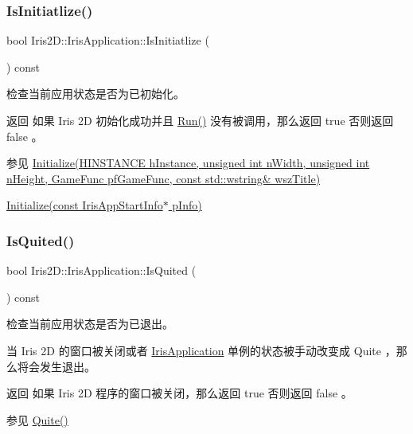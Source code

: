 \subsubsection{\texorpdfstring{Is\+Initiatlize()}{IsInitiatlize()}}
{\footnotesize\ttfamily bool Iris2\+D\+::\+Iris\+Application\+::\+Is\+Initiatlize (\begin{DoxyParamCaption}{ }\end{DoxyParamCaption}) const}



检查当前应用状态是否为已初始化。 

\begin{DoxyReturn}{返回}
如果 Iris 2D 初始化成功并且 \hyperlink{class_iris2_d_1_1_iris_application_ae6bb59365978c945201fd8cf82105e4f}{Run()} 没有被调用，那么返回 true 否则返回 false 。 
\end{DoxyReturn}
\begin{DoxySeeAlso}{参见}
\hyperlink{class_iris2_d_1_1_iris_application_a84f3ddebb3a3ffb0c172bd41fb952e1a}{Initialize(\+H\+I\+N\+S\+T\+A\+N\+C\+E h\+Instance, unsigned int n\+Width, unsigned int n\+Height, Game\+Func pf\+Game\+Func, const std\+::wstring\& wsz\+Title)} 

\hyperlink{class_iris2_d_1_1_iris_application_ac20656815694f980fccfc4369727a9a9}{Initialize(const Iris\+App\+Start\+Info$\ast$ p\+Info)} 
\end{DoxySeeAlso}
\mbox{\label{class_iris2_d_1_1_iris_application_ae9760ff496a4c80f96ad49331407c2e4}} 
\subsubsection{\texorpdfstring{Is\+Quited()}{IsQuited()}}
{\footnotesize\ttfamily bool Iris2\+D\+::\+Iris\+Application\+::\+Is\+Quited (\begin{DoxyParamCaption}{ }\end{DoxyParamCaption}) const}



检查当前应用状态是否为已退出。 

当 Iris 2D 的窗口被关闭或者 \hyperlink{class_iris2_d_1_1_iris_application}{Iris\+Application} 单例的状态被手动改变成 Quite ，那么将会发生退出。 \begin{DoxyReturn}{返回}
如果 Iris 2D 程序的窗口被关闭，那么返回 true 否则返回 false 。 
\end{DoxyReturn}
\begin{DoxySeeAlso}{参见}
\hyperlink{class_iris2_d_1_1_iris_application_adca8cada1a8841c3f409e856f6878331}{Quite()} 
\end{DoxySeeAlso}
\mbox{\label{class_iris2_d_1_1_iris_application_a795cea1f5d8112a7db7d6429f306a5ff}} 
